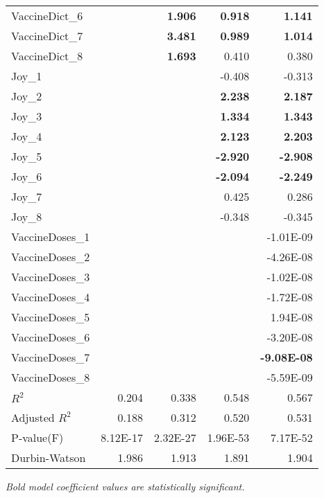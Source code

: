 \begin{longtable}[c]{@{}lrrrr@{}}
VaccineDict\_6 &  & \textbf{1.906} & \textbf{0.918} & \textbf{1.141} \\
VaccineDict\_7 &  & \textbf{3.481} & \textbf{0.989} & \textbf{1.014} \\
VaccineDict\_8 &  & \textbf{1.693} & 0.410 & 0.380 \\
Joy\_1 &  &  & -0.408 & -0.313 \\
Joy\_2 &  &  & \textbf{2.238} & \textbf{2.187} \\
Joy\_3 &  &  & \textbf{1.334} & \textbf{1.343} \\
Joy\_4 &  &  & \textbf{2.123} & \textbf{2.203} \\
Joy\_5 &  &  & \textbf{-2.920} & \textbf{-2.908} \\
Joy\_6 &  &  & \textbf{-2.094} & \textbf{-2.249} \\
Joy\_7 &  &  & 0.425 & 0.286 \\
Joy\_8 &  &  & -0.348 & -0.345 \\
VaccineDoses\_1 &  &  &  & -1.01E-09 \\
VaccineDoses\_2 &  &  &  & -4.26E-08 \\
VaccineDoses\_3 &  &  &  & -1.02E-08 \\
VaccineDoses\_4 &  &  &  & -1.72E-08 \\
VaccineDoses\_5 &  &  &  & 1.94E-08 \\
VaccineDoses\_6 &  &  &  & -3.20E-08 \\
VaccineDoses\_7 &  &  &  & \textbf{-9.08E-08} \\
VaccineDoses\_8 &  &  &  & -5.59E-09 \\
$R^2$ & 0.204 & 0.338 & 0.548 & 0.567 \\
Adjusted $R^2$ & 0.188 & 0.312 & 0.520 & 0.531 \\
P-value(F) & 8.12E-17 & 2.32E-27 & 1.96E-53 & 7.17E-52 \\
Durbin-Watson & 1.986 & 1.913 & 1.891 & 1.904 \\* \bottomrule
\end{longtable}
\emph{Bold model coefficient values are statistically significant.}



